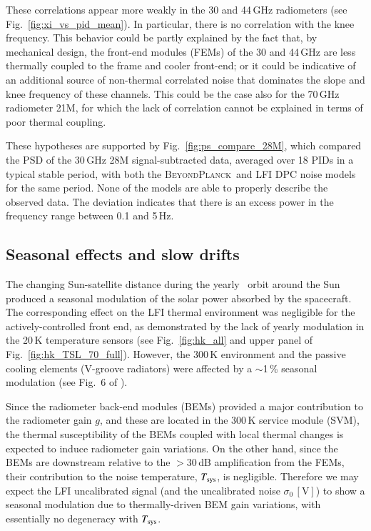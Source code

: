 \documentclass[twocolumn]{aa}
\newcommand{\BP}{\textsc{BeyondPlanck}}
\begin{document}
These correlations appear more weakly in the 30
and 44\,GHz radiometers (see Fig.~\ref{fig:xi_vs_pid_mean}). In
particular, there is no correlation with the knee frequency. This
behavior could be partly explained by the fact that, by mechanical
design, the front-end modules (FEMs) of the 30 and 44\,GHz are less
thermally coupled to the frame and cooler front-end; or it could be
indicative of an additional source of non-thermal correlated noise
that dominates the slope and knee frequency of these channels. This
could be the case also for the 70\,GHz radiometer 21M, for which the
lack of correlation cannot be explained in terms of poor thermal
coupling.

These hypotheses are supported by Fig.~\ref{fig:ps_compare_28M},
which compared the PSD of the 30\,GHz 28M signal-subtracted data,
averaged over 18 PIDs in a typical stable period, with both the
\BP\ and LFI DPC noise models for the same period. None of the models
are able to properly describe the observed data. The deviation
indicates that there is an excess power in the frequency range between
0.1 and 5\,Hz.


\subsection{Seasonal effects and slow drifts}
\label{sec:seasonal}
The changing Sun-satellite distance during the yearly \Planck\ orbit
around the Sun produced a seasonal modulation of the solar power
absorbed by the spacecraft. The corresponding effect on the LFI
thermal environment was negligible for the
actively-controlled front end, as demonstrated by the lack of yearly
modulation in the 20\,K temperature sensors (see Fig.~\ref{fig:hk_all} and
upper panel of Fig.~\ref{fig:hk_TSL_70_full}). However, the 300\,K
environment and the passive cooling elements (V-groove radiators) were
affected by a $\sim$1\,\% seasonal modulation (see Fig.~6 of
\citealp{planck2013-p01}).

Since the radiometer back-end modules (BEMs) provided a major
contribution to the radiometer gain $g$, and these are located in the
300\,K service module (SVM), the thermal susceptibility of the BEMs
coupled with local thermal changes is expected to induce radiometer
gain variations. On the other hand, since the BEMs are downstream
relative to the $>$30\,dB amplification from the FEMs, their
contribution to the noise temperature, $T_{\rm sys}$, is
negligible. Therefore we may expect the LFI uncalibrated signal (and
the uncalibrated noise $\sigma_0 \,\mathrm{[V]}$) to show a seasonal
modulation due to thermally-driven BEM gain variations, with
essentially no degeneracy with $T_{\rm sys}$.
\end{document}

